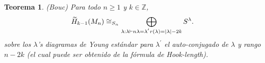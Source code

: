 \documentclass[12pt]{book}
\newtheorem{theorem}{Teorema}[section]
\theoremstyle{definition}
\newcounter{in}
\begin{document}
\begin{theorem}(Bouc)
  Para todo $n\geq1$ y $k\in \mathbb{Z}$,
  \begin{equation*}
    \widetilde H_{k-1}(M_{n})\cong_{S_{n}}\bigoplus_{\lambda:\lambda\vdash n\\
      \lambda=\lambda^{'}\\r(\lambda)=\mid \lambda \mid-2k} S^{\lambda}.
  \end{equation*}
  sobre los $\lambda$'s diagramas de Young estándar para $\lambda^{'}$
  el auto-conjugado de $\lambda$ y rango $n-2k$ (el cual puede ser
  obtenido de la fórmula de Hook-length).
\end{theorem}


% 

% 

\printindex
\end{document}
